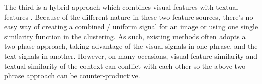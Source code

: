 The third is a hybrid approach which combines visual features with textual
features \cite{Fu2011}.
Because of the different nature in these two feature sources,
there's no easy way of creating a combined / uniform signal for an image
or using one single similarity function in the clustering.
As such, existing methods often adopts a two-phase
approach, taking advantage of the visual signals in one phrase, and the
text signals in another. However, on many occasions, visual feature
similarity and textual similarity of the context can conflict with each other
so the above two-phrase approach can be counter-productive.


%
%

